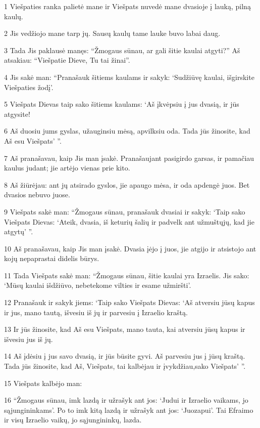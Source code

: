 \par 1 Viešpaties ranka palietė mane ir Viešpats nuvedė mane dvasioje į lauką, pilną kaulų. 
\par 2 Jis vedžiojo mane tarp jų. Sausų kaulų tame lauke buvo labai daug. 
\par 3 Tada Jis paklausė manęs: “Žmogaus sūnau, ar gali šitie kaulai atgyti?” Aš atsakiau: “Viešpatie Dieve, Tu tai žinai”. 
\par 4 Jis sakė man: “Pranašauk šitiems kaulams ir sakyk: ‘Sudžiūvę kaulai, išgirskite Viešpaties žodį’. 
\par 5 Viešpats Dievas taip sako šitiems kaulams: ‘Aš įkvėpsiu į jus dvasią, ir jūs atgysite! 
\par 6 Aš duosiu jums gyslas, užauginsiu mėsą, apvilksiu oda. Tada jūs žinosite, kad Aš esu Viešpats’ ”. 
\par 7 Aš pranašavau, kaip Jis man įsakė. Pranašaujant pasigirdo garsas, ir pamačiau kaulus judant; jie artėjo vienas prie kito. 
\par 8 Aš žiūrėjau: ant jų atsirado gyslos, jie apaugo mėsa, ir oda apdengė juos. Bet dvasios nebuvo juose. 
\par 9 Viešpats sakė man: “Žmogaus sūnau, pranašauk dvasiai ir sakyk: ‘Taip sako Viešpats Dievas: ‘Ateik, dvasia, iš keturių šalių ir padvelk ant užmuštųjų, kad jie atgytų’ ”. 
\par 10 Aš pranašavau, kaip Jis man įsakė. Dvasia įėjo į juos, jie atgijo ir atsistojo ant kojų nepaprastai didelis būrys. 
\par 11 Tada Viešpats sakė man: “Žmogaus sūnau, šitie kaulai yra Izraelis. Jis sako: ‘Mūsų kaulai išdžiūvo, nebetekome vilties ir esame užmiršti’. 
\par 12 Pranašauk ir sakyk jiems: ‘Taip sako Viešpats Dievas: ‘Aš atversiu jūsų kapus ir jus, mano tautą, išvesiu iš jų ir parvesiu į Izraelio kraštą. 
\par 13 Ir jūs žinosite, kad Aš esu Viešpats, mano tauta, kai atversiu jūsų kapus ir išvesiu jus iš jų. 
\par 14 Aš įdėsiu į jus savo dvasią, ir jūs būsite gyvi. Aš parvesiu jus į jūsų kraštą. Tada jūs žinosite, kad Aš, Viešpats, tai kalbėjau ir įvykdžiau,­sako Viešpats’ ”. 
\par 15 Viešpats kalbėjo man: 
\par 16 “Žmogaus sūnau, imk lazdą ir užrašyk ant jos: ‘Judui ir Izraelio vaikams, jo sąjungininkams’. Po to imk kitą lazdą ir užrašyk ant jos: ‘Juozapui’. Tai Efraimo ir visų Izraelio vaikų, jo sąjungininkų, lazda. 
